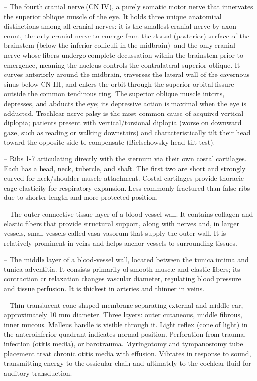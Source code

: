 -- The fourth cranial nerve (CN IV), a purely somatic motor nerve that innervates the superior oblique muscle of the eye. It holds three unique anatomical distinctions among all cranial nerves: it is the smallest cranial nerve by axon count, the only cranial nerve to emerge from the dorsal (posterior) surface of the brainstem (below the inferior colliculi in the midbrain), and the only cranial nerve whose fibers undergo complete decussation within the brainstem prior to emergence, meaning the nucleus controls the contralateral superior oblique. It curves anteriorly around the midbrain, traverses the lateral wall of the cavernous sinus below CN III, and enters the orbit through the superior orbital fissure outside the common tendinous ring. The superior oblique muscle intorts, depresses, and abducts the eye; its depressive action is maximal when the eye is adducted. Trochlear nerve palsy is the most common cause of acquired vertical diplopia; patients present with vertical/torsional diplopia (worse on downward gaze, such as reading or walking downstairs) and characteristically tilt their head toward the opposite side to compensate (Bielschowsky head tilt test).

-- Ribs 1-7 articulating directly with the sternum via their own costal cartilages. Each has a head, neck, tubercle, and shaft. The first two are short and strongly curved for neck/shoulder muscle attachment. Costal cartilages provide thoracic cage elasticity for respiratory expansion. Less commonly fractured than false ribs due to shorter length and more protected position.

-- The outer connective-tissue layer of a blood-vessel wall. It contains collagen and elastic fibers that provide structural support, along with nerves and, in larger vessels, small vessels called vasa vasorum that supply the outer wall. It is relatively prominent in veins and helps anchor vessels to surrounding tissues.

-- The middle layer of a blood-vessel wall, located between the tunica intima and tunica adventitia. It consists primarily of smooth muscle and elastic fibers; its contraction or relaxation changes vascular diameter, regulating blood pressure and tissue perfusion. It is thickest in arteries and thinner in veins.

-- Thin translucent cone-shaped membrane separating external and middle ear, approximately 10 mm diameter. Three layers: outer cutaneous, middle fibrous, inner mucous. Malleus handle is visible through it. Light reflex (cone of light) in the anteroinferior quadrant indicates normal position. Perforation from trauma, infection (otitis media), or barotrauma. Myringotomy and tympanostomy tube placement treat chronic otitis media with effusion. Vibrates in response to sound, transmitting energy to the ossicular chain and ultimately to the cochlear fluid for auditory transduction.

